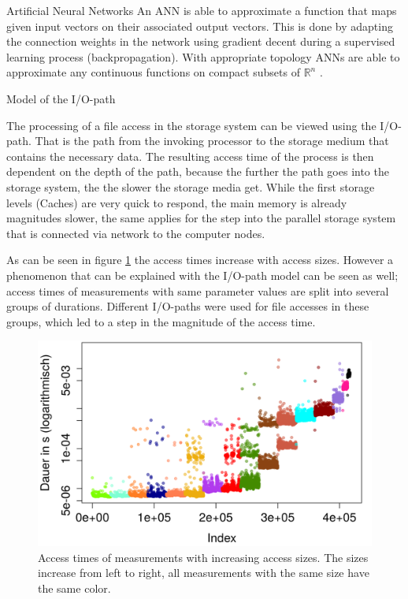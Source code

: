 \documentclass[final]{beamer}
\newlength{\onecolwid}
\begin{document}
\begin{frame}[t]
\begin{columns}[t]
\begin{column}{\onecolwid}
\begin{block}{Artificial Neural Networks}
	An ANN is able to approximate a function that maps given input vectors on their associated output vectors.
	This is done by adapting the connection weights in the network using gradient decent during a supervised learning process (backpropagation).
	With appropriate topology ANNs are able to approximate any continuous functions on compact subsets of $\mathbb{R}^n$ \cite{cybenko:mcss}.
	
	
\end{block}

\begin{block}{Model of the I/O-path}
	
	The processing of a file access in the storage system can be viewed using the I/O-path.
	That is the path from the invoking processor to the storage medium that contains the necessary data.
	The resulting access time of the process is then dependent on the depth of the path, because the further the path goes into the storage system, the the slower the storage media get.
	While the first storage levels (Caches) are very quick to respond, the main memory is already magnitudes slower, the same applies for the step into the parallel storage system that is connected via network to the computer nodes.\medskip
	
	As can be seen in figure \ref{read_rnd} the access times increase with access sizes.
	However a phenomenon that can be explained with the I/O-path model can be seen as well; access times of measurements with same parameter values are split into several groups of durations. Different I/O-paths were used for file accesses in these groups, which led to a step in the magnitude of the access time. 
	
	\begin{figure}
		\label{read_rnd}
		\includegraphics[width=0.8\linewidth]{src/plot_SizeSorted_log_read_seq.png}
		\caption{Access times of measurements with increasing access sizes. The sizes increase from left to right, all measurements with the same size have the same color.}
	\end{figure}
	

\end{block}
\end{column}
\end{columns}
\end{frame}
\end{document}
